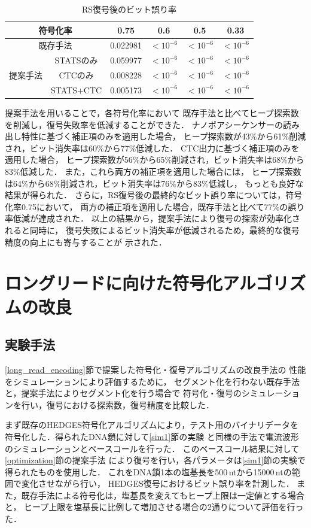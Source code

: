 \documentclass[sotsuron]{kuee}
\begin{document}
\begin{table}
  \centering
  \caption{RS復号後のビット誤り率}
  \label{tab:results_final_ber}
  \begin{tabular}{c|c|cccc}
    \hline
    \multicolumn{2}{c|}{符号化率} & 0.75 & 0.6 & 0.5 & 0.33 \\
    \hline
    \multicolumn{2}{c|}{既存手法} & 0.022981 & $<10^{-6}$ & $<10^{-6}$ & $<10^{-6}$ \\
    \hline
    \multirow{3}{*}{提案手法} & STATSのみ & 0.059977 & $<10^{-6}$ & $<10^{-6}$ & $<10^{-6}$ \\
    \cline{2-6}
     & CTCのみ & 0.008228 & $<10^{-6}$ & $<10^{-6}$ & $<10^{-6}$ \\
    \cline{2-6}
     & STATS+CTC & 0.005173 & $<10^{-6}$ & $<10^{-6}$ & $<10^{-6}$ \\
    \hline
  \end{tabular}
\end{table}
提案手法を用いることで，各符号化率において
既存手法と比べてヒープ探索数を削減し，復号失敗率を低減することができた．
ナノポアシーケンサーの読み出し特性に基づく補正項のみを適用した場合，
ヒープ探索数が43\%から61\%削減され，ビット消失率は60\%から77\%低減した．
CTC出力に基づく補正項のみを適用した場合，
ヒープ探索数が56\%から65\%削減され，ビット消失率は68\%から83\%低減した．
また，これら両方の補正項を適用した場合には，
ヒープ探索数は64\%から68\%削減され，ビット消失率は76\%から83\%低減し，
もっとも良好な結果が得られた．
さらに，RS復号後の最終的なビット誤り率については，符号化率0.75において，
両方の補正項を適用した場合，既存手法と比べて77\%の誤り率低減が達成された．
以上の結果から，提案手法により復号の探索が効率化されると同時に，
復号失敗によるビット消失率が低減されるため，最終的な復号精度の向上にも寄与することが
示された．

\section{ロングリードに向けた符号化アルゴリズムの改良} \label{sim2}
\subsection{実験手法}
\ref{long_read_encoding}節で提案した符号化・復号アルゴリズムの改良手法の
性能をシミュレーションにより評価するために，
セグメント化を行わない既存手法と，提案手法によりセグメント化を行う場合で
符号化・復号のシミュレーションを行い，復号における探索数，復号精度を比較した．

まず既存のHEDGES符号化アルゴリズムにより，テスト用のバイナリデータを
符号化した．得られたDNA鎖に対して\ref{sim1}節の実験
と同様の手法で電流波形のシミュレーションとベースコールを行った．
このベースコール結果に対して\ref{optimization}節の提案手法
により復号を行い，各パラメータは\ref{sim1}節の実験で得られたものを使用した．
これをDNA鎖1本の塩基長を500\,ntから15000\,ntの範囲で変化させながら行い，
HEDGES復号におけるビット誤り率を計測した．
また，既存手法による符号化は，塩基長を変えてもヒープ上限は一定値とする場合と，
ヒープ上限を塩基長に比例して増加させる場合の2通りについて評価を行った．
\end{document}

